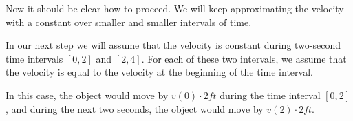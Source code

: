 \documentclass{ximera}
\begin{document}
\begin{example}
\begin{explanation}
%
%
%
%
%
Now it should be clear how to proceed. We will keep approximating the velocity with a constant over smaller and smaller intervals of time.


In our next step we will assume that the velocity is constant during two-second time intervals $[0,2]$ and $[2,4]$. For each of these two intervals, we assume that the velocity is equal to the velocity at the beginning of the time interval.

In this case,  the object would move by $v(0)\cdot2 \unit{ft}$ during the time interval $[0,2]$, and during the next two seconds, the object would move by $v(2)\cdot2 \unit{ft}$.



\end{explanation}
\end{example}
\end{document}
